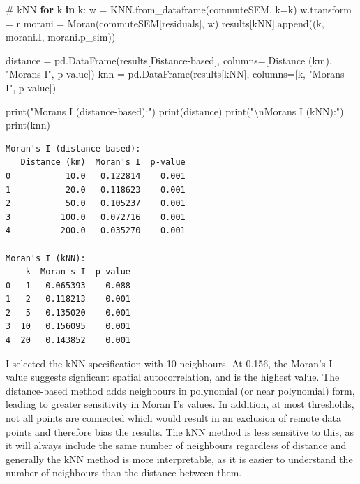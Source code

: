 \documentclass[
  number]{elsarticle}
\newenvironment{Shaded}{\begin{snugshade}}{\end{snugshade}}
\newcommand{\BuiltInTok}[1]{\textcolor[rgb]{0.00,0.23,0.31}{#1}}
\newcommand{\CharTok}[1]{\textcolor[rgb]{0.13,0.47,0.30}{#1}}
\newcommand{\CommentTok}[1]{\textcolor[rgb]{0.37,0.37,0.37}{#1}}
\newcommand{\ControlFlowTok}[1]{\textcolor[rgb]{0.00,0.23,0.31}{\textbf{#1}}}
\newcommand{\KeywordTok}[1]{\textcolor[rgb]{0.00,0.23,0.31}{\textbf{#1}}}
\newcommand{\NormalTok}[1]{\textcolor[rgb]{0.00,0.23,0.31}{#1}}
\newcommand{\OperatorTok}[1]{\textcolor[rgb]{0.37,0.37,0.37}{#1}}
\newcommand{\StringTok}[1]{\textcolor[rgb]{0.13,0.47,0.30}{#1}}
\begin{document}
\begin{Shaded}
\begin{Highlighting}[]
\CommentTok{\# kNN}
\ControlFlowTok{for}\NormalTok{ k }\KeywordTok{in}\NormalTok{ k:}
\NormalTok{    w }\OperatorTok{=}\NormalTok{ KNN.from\_dataframe(commuteSEM, k}\OperatorTok{=}\NormalTok{k)}
\NormalTok{    w.transform }\OperatorTok{=} \StringTok{\textquotesingle{}r\textquotesingle{}}
\NormalTok{    morani }\OperatorTok{=}\NormalTok{ Moran(commuteSEM[}\StringTok{\textquotesingle{}residuals\textquotesingle{}}\NormalTok{], w)}
\NormalTok{    results[}\StringTok{\textquotesingle{}kNN\textquotesingle{}}\NormalTok{].append((k, morani.I, morani.p\_sim))}

\NormalTok{distance }\OperatorTok{=}\NormalTok{ pd.DataFrame(results[}\StringTok{\textquotesingle{}Distance{-}based\textquotesingle{}}\NormalTok{],}
\NormalTok{                       columns}\OperatorTok{=}\NormalTok{[}\StringTok{\textquotesingle{}Distance (km)\textquotesingle{}}\NormalTok{, }\StringTok{"Moran\textquotesingle{}s I"}\NormalTok{, }\StringTok{\textquotesingle{}p{-}value\textquotesingle{}}\NormalTok{])}
\NormalTok{knn }\OperatorTok{=}\NormalTok{ pd.DataFrame(results[}\StringTok{\textquotesingle{}kNN\textquotesingle{}}\NormalTok{], columns}\OperatorTok{=}\NormalTok{[}\StringTok{\textquotesingle{}k\textquotesingle{}}\NormalTok{, }\StringTok{"Moran\textquotesingle{}s I"}\NormalTok{, }\StringTok{\textquotesingle{}p{-}value\textquotesingle{}}\NormalTok{])}

\BuiltInTok{print}\NormalTok{(}\StringTok{"Moran\textquotesingle{}s I (distance{-}based):"}\NormalTok{)}
\BuiltInTok{print}\NormalTok{(distance)}
\BuiltInTok{print}\NormalTok{(}\StringTok{"}\CharTok{\textbackslash{}n}\StringTok{Moran\textquotesingle{}s I (kNN):"}\NormalTok{)}
\BuiltInTok{print}\NormalTok{(knn)}
\end{Highlighting}
\end{Shaded}

\begin{verbatim}
Moran's I (distance-based):
   Distance (km)  Moran's I  p-value
0           10.0   0.122814    0.001
1           20.0   0.118623    0.001
2           50.0   0.105237    0.001
3          100.0   0.072716    0.001
4          200.0   0.035270    0.001

Moran's I (kNN):
    k  Moran's I  p-value
0   1   0.065393    0.088
1   2   0.118213    0.001
2   5   0.135020    0.001
3  10   0.156095    0.001
4  20   0.143852    0.001
\end{verbatim}

I selected the kNN specification with 10 neighbours. At 0.156, the
Moran's I value suggests signficant spatial autocorrelation, and is the
highest value. The distance-based method adds neighbours in polynomial
(or near polynomial) form, leading to greater sensitivity in Moran I's
values. In addition, at most thresholds, not all points are connected
which would result in an exclusion of remote data points and therefore
bias the results. The kNN method is less sensitive to this, as it will
always include the same number of neighbours regardless of distance and
generally the kNN method is more interpretable, as it is easier to
understand the number of neighbours than the distance between them.
\end{document}
